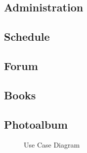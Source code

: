 \subsection{Administration}

\subsection{Schedule}

\subsection{Forum}

\subsection{Books}

\subsection{Photoalbum}

\begin{figure}[]
    \centering
    \caption{Use Case Diagram}
    \label{}
\end{figure}

